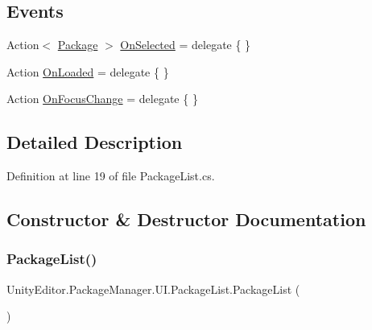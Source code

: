 \subsection*{Events}
\begin{DoxyCompactItemize}
\item 
Action$<$ \mbox{\hyperlink{class_unity_editor_1_1_package_manager_1_1_u_i_1_1_package}{Package}} $>$ \mbox{\hyperlink{class_unity_editor_1_1_package_manager_1_1_u_i_1_1_package_list_a853b9ef8931a5f303d0929c2a691edf7}{On\+Selected}} = delegate \{ \}
\item 
Action \mbox{\hyperlink{class_unity_editor_1_1_package_manager_1_1_u_i_1_1_package_list_a3756ca2e840c663d3efb5881a8314b9b}{On\+Loaded}} = delegate \{ \}
\item 
Action \mbox{\hyperlink{class_unity_editor_1_1_package_manager_1_1_u_i_1_1_package_list_a32525f3e31f2562eb8d4ca11639636e9}{On\+Focus\+Change}} = delegate \{ \}
\end{DoxyCompactItemize}


\subsection{Detailed Description}


Definition at line 19 of file Package\+List.\+cs.



\subsection{Constructor \& Destructor Documentation}
\mbox{\label{class_unity_editor_1_1_package_manager_1_1_u_i_1_1_package_list_ac0ea717075ee9f54e3a5ba2178d986f1}} 
\subsubsection{\texorpdfstring{PackageList()}{PackageList()}}
{\footnotesize\ttfamily Unity\+Editor.\+Package\+Manager.\+U\+I.\+Package\+List.\+Package\+List (\begin{DoxyParamCaption}{ }\end{DoxyParamCaption})}



